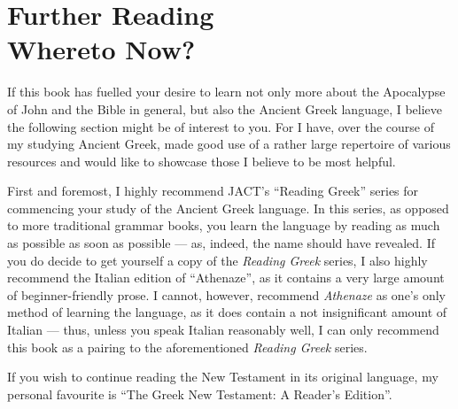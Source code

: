 \chapter*{Further Reading \\ \large Whereto Now?}
  
If this book has fuelled your desire to learn not only more about the Apocalypse of John and the Bible in general, but also the Ancient Greek language, I believe the following section might be of interest to you. For I have, over the course of my studying Ancient Greek, made good use of a rather large repertoire of various resources and would like to showcase those I believe to be most helpful. 

First and foremost, I highly recommend JACT's ``Reading Greek'' series for commencing your study of the Ancient Greek language. In this series, as opposed to more traditional grammar books, you learn the language by reading as much as possible as soon as possible — as, indeed, the name should have revealed. If you do decide to get yourself a copy of the \textit{Reading Greek} series, I also highly recommend the Italian edition of ``Athenaze'', as it contains a very large amount of beginner-friendly prose. I cannot, however, recommend \textit{Athenaze} as one's only method of learning the language, as it does contain a not insignificant amount of Italian — thus, unless you speak Italian reasonably well, I can only recommend this book as a pairing to the aforementioned \textit{Reading Greek} series.

If you wish to continue reading the New Testament in its original language, my personal favourite is ``The Greek New Testament: A Reader's Edition''. 